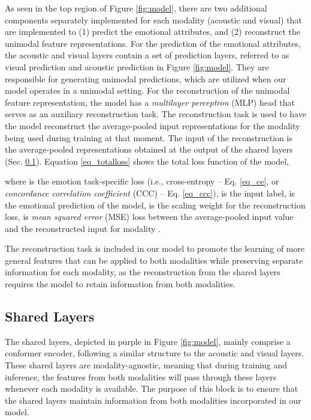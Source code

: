 \documentclass{article}
\begin{document}
As seen in the top region of Figure \ref{fig:model}, there are two additional components separately implemented for each modality (acoustic and visual) that are implemented to (1) predict the emotional attributes, and (2) reconstruct the unimodal feature representations. For the prediction of the emotional attributes, the acoustic and visual layers contain a set of prediction layers, referred to as visual prediction and acoustic prediction in Figure \ref{fig:model}. They are responsible for generating unimodal predictions, which are utilized when our model operates in a unimodal setting. For the reconstruction of the unimodal feature representation, the model has a \emph{multilayer perceptron} (MLP) head that serves as an auxiliary reconstruction task. The reconstruction task is used to have the model reconstruct the average-pooled input representations for the modality being used during training at that moment. The input of the reconstruction is the average-pooled representations obtained at the output of the shared layers (Sec. \ref{ssec:SharedLayers}). Equation \ref{eq_totalloss} shows the total loss function of the model, 

 

\noindent
where  is the emotion task-specific loss (i.e., cross-entropy -- Eq. \ref{eq_ce}, or \emph{concordance correlation coefficient} (CCC) -- Eq. \ref{eq_ccc}),  is the input label,  is the emotional prediction of the model,  is the scaling weight for the reconstruction loss,  is \emph{mean squared error} (MSE) loss between the average-pooled input value  and the reconstructed input  for modality .

The reconstruction task is included in our model to promote the learning of more general features that can be applied to both modalities while preserving separate information for each modality, as the reconstruction from the shared layers requires the model to retain information from both modalities.


\subsection{Shared Layers}
\label{ssec:SharedLayers}

The shared layers, depicted in purple in Figure \ref{fig:model}, mainly comprise a conformer encoder, following a similar structure to the acoustic and visual layers. These shared layers are modality-agnostic, meaning that during training and inference, the features from both modalities will pass through these layers whenever each modality is available. The purpose of this block is to ensure that the shared layers maintain information from both modalities incorporated in our model.
\end{document}
